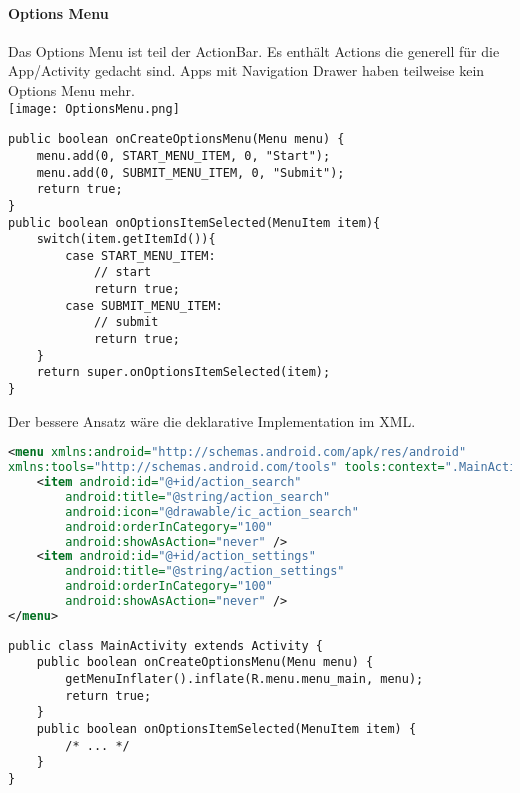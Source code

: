 \paragraph{Options Menu} Das Options Menu ist teil der ActionBar. Es enthält Actions die generell für die App/Activity gedacht sind. Apps mit Navigation Drawer haben teilweise kein Options Menu mehr. \\
\texttt{[image: OptionsMenu.png]}
\begin{lstlisting}
public boolean onCreateOptionsMenu(Menu menu) {
    menu.add(0, START_MENU_ITEM, 0, "Start");
    menu.add(0, SUBMIT_MENU_ITEM, 0, "Submit");
    return true;
}
public boolean onOptionsItemSelected(MenuItem item){
    switch(item.getItemId()){
        case START_MENU_ITEM:
            // start
            return true;
        case SUBMIT_MENU_ITEM:
            // submit
            return true;
    }
    return super.onOptionsItemSelected(item);
}
\end{lstlisting}
Der bessere Ansatz wäre die deklarative Implementation im XML.
\begin{lstlisting}[language=xml]
<menu xmlns:android="http://schemas.android.com/apk/res/android"
xmlns:tools="http://schemas.android.com/tools" tools:context=".MainActivity">
    <item android:id="@+id/action_search"
        android:title="@string/action_search"
        android:icon="@drawable/ic_action_search"
        android:orderInCategory="100"
        android:showAsAction="never" />
    <item android:id="@+id/action_settings"
        android:title="@string/action_settings"
        android:orderInCategory="100"
        android:showAsAction="never" />
</menu>
\end{lstlisting}
\begin{lstlisting}
public class MainActivity extends Activity {
    public boolean onCreateOptionsMenu(Menu menu) {
        getMenuInflater().inflate(R.menu.menu_main, menu);
        return true;
    }
    public boolean onOptionsItemSelected(MenuItem item) {
        /* ... */
    }
}
\end{lstlisting}
